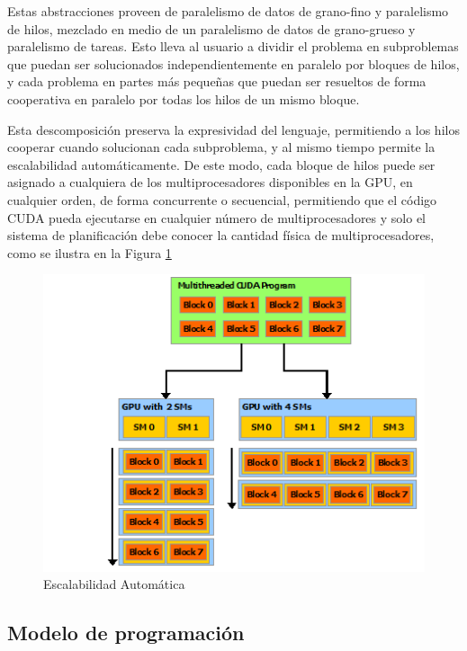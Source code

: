 \documentclass[a4paper,openright,12pt, oneside]{book}
\begin{document}
Estas abstracciones proveen de paralelismo de datos de grano-fino y paralelismo de
hilos, mezclado en medio de un paralelismo de datos de grano-grueso y paralelismo de tareas.
Esto lleva al usuario a dividir el problema en subproblemas que puedan ser solucionados
independientemente en paralelo por bloques de hilos, y cada problema en partes m\'as
peque\~nas que puedan ser resueltos de forma cooperativa en paralelo por todas los
hilos de un mismo bloque.

Esta descomposici\'on preserva la expresividad del lenguaje, permitiendo a los hilos
cooperar cuando solucionan cada subproblema, y al mismo tiempo permite la escalabilidad
autom\'aticamente. De este modo, cada bloque de hilos puede ser asignado a cualquiera
de los multiprocesadores disponibles en la GPU, en cualquier orden, de forma concurrente
o secuencial, permitiendo que el c\'odigo CUDA pueda ejecutarse en cualquier n\'umero
de multiprocesadores y solo el sistema de planificaci\'on debe conocer la cantidad
f\'isica de multiprocesadores, como se ilustra en la Figura \ref{CUDA1}

\begin{figure}[!htbp]
  \begin{center}
    \leavevmode

    \includegraphics[]{automatic-scalability.png}

    \caption{Escalabilidad Autom\'atica}
    \label{CUDA1}
  \end{center}
\end{figure}


\subsection{Modelo de programaci\'on}
\end{document}
